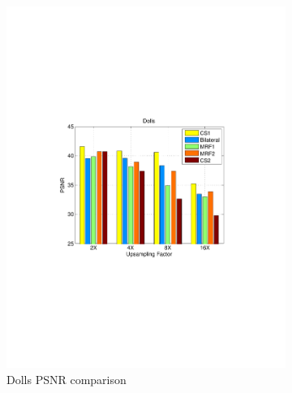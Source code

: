 \documentclass[preprint,10pt,5p,times,twocolumn]{elsarticle}
\begin{document}
\begin{figure}
\begin{subfigure}[b]{0.24\textwidth}
\includegraphics[width=\textwidth]{fig_exp1_dolls.pdf}
\caption*{Dolls PSNR comparison}
\end{subfigure}
\begin{subfigure}[b]{0.24\textwidth}

\end{subfigure}
\end{figure}
\end{document}
